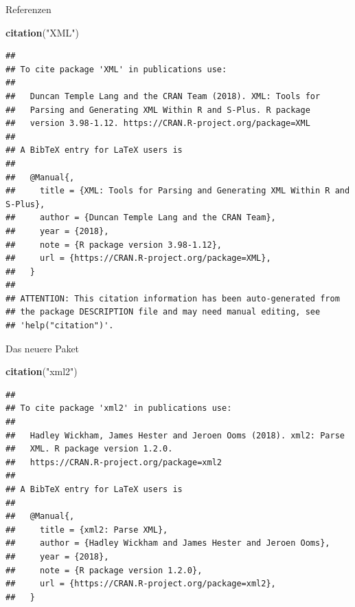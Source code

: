\documentclass[ignorenonframetext,]{beamer}
\newenvironment{Shaded}{\begin{snugshade}}{\end{snugshade}}
\newcommand{\KeywordTok}[1]{\textcolor[rgb]{0.13,0.29,0.53}{\textbf{#1}}}
\newcommand{\StringTok}[1]{\textcolor[rgb]{0.31,0.60,0.02}{#1}}
\newcommand{\NormalTok}[1]{#1}
\begin{document}
\begin{frame}[fragile]{Referenzen}

\begin{Shaded}
\begin{Highlighting}[]
\KeywordTok{citation}\NormalTok{(}\StringTok{"XML"}\NormalTok{)}
\end{Highlighting}
\end{Shaded}

\begin{verbatim}
## 
## To cite package 'XML' in publications use:
## 
##   Duncan Temple Lang and the CRAN Team (2018). XML: Tools for
##   Parsing and Generating XML Within R and S-Plus. R package
##   version 3.98-1.12. https://CRAN.R-project.org/package=XML
## 
## A BibTeX entry for LaTeX users is
## 
##   @Manual{,
##     title = {XML: Tools for Parsing and Generating XML Within R and S-Plus},
##     author = {Duncan Temple Lang and the CRAN Team},
##     year = {2018},
##     note = {R package version 3.98-1.12},
##     url = {https://CRAN.R-project.org/package=XML},
##   }
## 
## ATTENTION: This citation information has been auto-generated from
## the package DESCRIPTION file and may need manual editing, see
## 'help("citation")'.
\end{verbatim}

\end{frame}

\begin{frame}[fragile]{Das neuere Paket}

\begin{Shaded}
\begin{Highlighting}[]
\KeywordTok{citation}\NormalTok{(}\StringTok{"xml2"}\NormalTok{)}
\end{Highlighting}
\end{Shaded}

\begin{verbatim}
## 
## To cite package 'xml2' in publications use:
## 
##   Hadley Wickham, James Hester and Jeroen Ooms (2018). xml2: Parse
##   XML. R package version 1.2.0.
##   https://CRAN.R-project.org/package=xml2
## 
## A BibTeX entry for LaTeX users is
## 
##   @Manual{,
##     title = {xml2: Parse XML},
##     author = {Hadley Wickham and James Hester and Jeroen Ooms},
##     year = {2018},
##     note = {R package version 1.2.0},
##     url = {https://CRAN.R-project.org/package=xml2},
##   }
\end{verbatim}

\end{frame}
\end{document}
